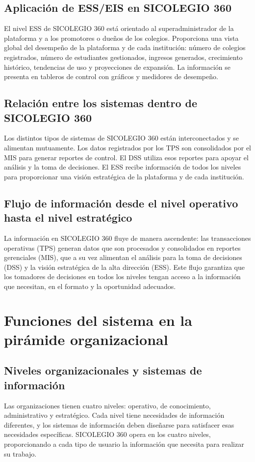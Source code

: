 \documentclass[12pt,a4paper,oneside]{report}
\begin{document}
\subsection{Aplicación de ESS/EIS en SICOLEGIO 360}
El nivel ESS de SICOLEGIO 360 está orientado al superadministrador de la plataforma y a los promotores o dueños de los colegios. Proporciona una vista global del desempeño de la plataforma y de cada institución: número de colegios registrados, número de estudiantes gestionados, ingresos generados, crecimiento histórico, tendencias de uso y proyecciones de expansión. La información se presenta en tableros de control con gráficos y medidores de desempeño.

\subsection{Relación entre los sistemas dentro de SICOLEGIO 360}
Los distintos tipos de sistemas de SICOLEGIO 360 están interconectados y se alimentan mutuamente. Los datos registrados por los TPS son consolidados por el MIS para generar reportes de control. El DSS utiliza esos reportes para apoyar el análisis y la toma de decisiones. El ESS recibe información de todos los niveles para proporcionar una visión estratégica de la plataforma y de cada institución.

\subsection{Flujo de información desde el nivel operativo hasta el nivel estratégico}
La información en SICOLEGIO 360 fluye de manera ascendente: las transacciones operativas (TPS) generan datos que son procesados y consolidados en reportes gerenciales (MIS), que a su vez alimentan el análisis para la toma de decisiones (DSS) y la visión estratégica de la alta dirección (ESS). Este flujo garantiza que los tomadores de decisiones en todos los niveles tengan acceso a la información que necesitan, en el formato y la oportunidad adecuados.

\section{Funciones del sistema en la pirámide organizacional}

\subsection{Niveles organizacionales y sistemas de información}
Las organizaciones tienen cuatro niveles: operativo, de conocimiento, administrativo y estratégico. Cada nivel tiene necesidades de información diferentes, y los sistemas de información deben diseñarse para satisfacer esas necesidades específicas. SICOLEGIO 360 opera en los cuatro niveles, proporcionando a cada tipo de usuario la información que necesita para realizar su trabajo.
\end{document}
